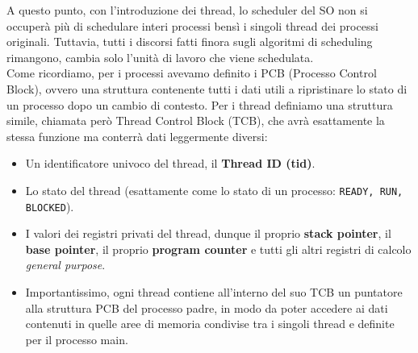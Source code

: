 \documentclass[12pt]{report}
\begin{document}
\begin{figure}[htbp]
	\end{figure}
	
	A questo punto, con l'introduzione dei thread, lo scheduler del SO non si occuperà più di schedulare interi processi bensì i singoli thread dei processi originali. Tuttavia, tutti i discorsi fatti finora sugli algoritmi di scheduling rimangono, cambia solo l'unità di lavoro che viene schedulata.\\
	Come ricordiamo, per i processi avevamo definito i PCB (Processo Control Block), ovvero una struttura contenente tutti i dati utili a ripristinare lo stato di un processo dopo un cambio di contesto. Per i thread definiamo una struttura simile, chiamata però Thread Control Block (TCB), che avrà esattamente la stessa funzione ma conterrà dati leggermente diversi:
	\begin{itemize}
		\item Un identificatore univoco del thread, il \textbf{Thread ID (tid)}.
		
		\item Lo stato del thread (esattamente come lo stato di un processo: \texttt{READY, RUN, BLOCKED}).
		
		\item I valori dei registri privati del thread, dunque il proprio \textbf{stack pointer}, il \textbf{base pointer}, il proprio \textbf{program counter} e tutti gli altri registri di calcolo \textit{general purpose}.
		
		\item Importantissimo, ogni thread contiene all'interno del suo TCB un puntatore alla struttura PCB del processo padre, in modo da poter accedere ai dati contenuti in quelle aree di memoria condivise tra i singoli thread e definite per il processo main.
	\end{itemize}
	
\end{document}

